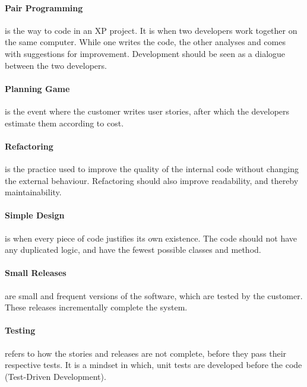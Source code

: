 \paragraph{Pair Programming} is the way to code in an XP project.
It is when two developers work together on the same computer.
While one writes the code, the other analyses and comes with suggestions for improvement.
Development should be seen as a dialogue between the two developers.

\paragraph{Planning Game} is the event where the customer writes user stories, after which the developers estimate them according to cost.

\paragraph{Refactoring} is the practice used to improve the quality of the internal code without changing the external behaviour. Refactoring should also improve readability, and thereby maintainability.

\paragraph{Simple Design} is when every piece of code justifies its own existence. The code should not have any duplicated logic, and have the fewest possible classes and method. %

\paragraph{Small Releases} are small and frequent versions of the software, which are tested by the customer.
These releases incrementally complete the system.

\paragraph{Testing} refers to how the stories and releases are not complete, before they pass their respective tests. It is a mindset in which, unit tests are developed before the code (Test-Driven Development).

